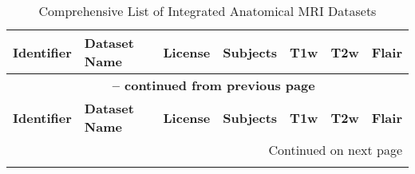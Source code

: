 \begin{center}
\small
\begin{longtable}{@{}lp{8.5cm}p{1.4cm}llll@{}}
    \caption{Comprehensive List of Integrated Anatomical MRI Datasets} \label{suppDataTable} \\
    \toprule
    \textbf{Identifier} & \textbf{Dataset Name} & \textbf{License} & \textbf{Subjects} & \textbf{T1w} & \textbf{T2w} & \textbf{Flair} \\
    \midrule
    \endfirsthead
    
    \multicolumn{7}{c}{{\bfseries \tablename\ \thetable{} -- continued from previous page}} \\
    \toprule
    \textbf{Identifier} & \textbf{Dataset Name} & \textbf{License} & \textbf{Subjects} & \textbf{T1w} & \textbf{T2w} & \textbf{Flair} \\
    \midrule
    \endhead
    
    \midrule \multicolumn{7}{r}{{Continued on next page}} \\
    \endfoot
    \bottomrule
    \endlastfoot
    

\end{longtable}
\end{center}
